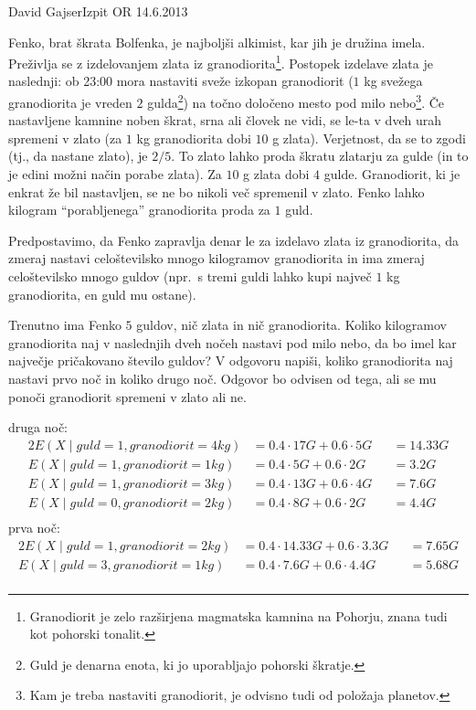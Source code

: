 \begin{naloga}{David Gajser}{Izpit OR 14.6.2013}
\begin{vprasanje}
Fenko, brat škrata Bolfenka, je najboljši alkimist, kar jih je družina imela.
Preživlja se z izdelovanjem zlata iz granodiorita\footnote{
Granodiorit je zelo razširjena magmatska kamnina na Pohorju,
znana tudi kot pohorski tonalit.
}.
Postopek izdelave zlata je naslednji:
ob 23:00 mora nastaviti sveže izkopan granodiorit
($1$ kg svežega granodiorita je vreden $2$ gulda\footnote{
Guld je denarna enota, ki jo uporabljajo pohorski škratje.
})
na točno določeno mesto pod milo nebo\footnote{
Kam je treba nastaviti granodiorit, je odvisno tudi od položaja planetov.
}.
Če nastavljene kamnine noben škrat, srna ali človek ne vidi,
se le-ta v dveh urah spremeni v zlato
(za $1$ kg granodiorita dobi $10$ g zlata).
Verjetnost, da se to zgodi (tj., da nastane zlato), je $2/5$.
To zlato lahko proda škratu zlatarju za gulde
(in to je edini možni način porabe zlata).
Za $10$ g zlata dobi $4$ gulde.
Granodiorit, ki je enkrat že bil nastavljen,
se ne bo nikoli več spremenil v zlato.
Fenko lahko kilogram ``porabljenega'' granodiorita proda za $1$ guld.

Predpostavimo, da Fenko zapravlja denar le za izdelavo zlata iz granodiorita,
da zmeraj nastavi celoštevilsko mnogo kilogramov granodiorita
in ima zmeraj celoštevilsko mnogo guldov
(npr.~s tremi guldi lahko kupi največ $1$ kg granodiorita, en guld mu ostane).

Trenutno ima Fenko $5$ guldov, nič zlata in nič granodiorita.
Koliko kilogramov granodiorita
naj v naslednjih dveh nočeh nastavi pod milo nebo,
da bo imel kar največje pričakovano število guldov?
V odgovoru napiši,
koliko granodiorita naj nastavi prvo noč in koliko drugo noč.
Odgovor bo odvisen od tega,
ali se mu ponoči granodiorit spremeni v zlato ali ne.
\end{vprasanje}

\begin{odgovor}
druga noč:
\begin{alignat*}{2}
E(X \mid  guld = 1, granodiorit = 4kg) &= 0.4 \cdot 17 G + 0.6 \cdot 5 G &&= 14.33 G \\
E(X \mid  guld = 1, granodiorit = 1kg) &= 0.4 \cdot 5 G + 0.6 \cdot 2 G &&= 3.2 G \\
E(X \mid  guld = 1, granodiorit = 3kg) &= 0.4 \cdot 13 G + 0.6 \cdot 4 G &&= 7.6 G \\
E(X \mid  guld = 0, granodiorit = 2kg) &= 0.4 \cdot 8 G + 0.6 \cdot 2 G &&= 4.4 G \\
\end{alignat*}
prva noč:
\begin{alignat*}{2}
E(X \mid  guld = 1, granodiorit = 2kg) &= 0.4 \cdot 14.33 G + 0.6 \cdot 3.3 G &&= 7.65 G \\
E(X \mid  guld = 3, granodiorit = 1kg) &= 0.4 \cdot 7.6 G + 0.6 \cdot 4.4 G &&= 5.68 G \\
\end{alignat*}


\end{odgovor}
\end{naloga}

